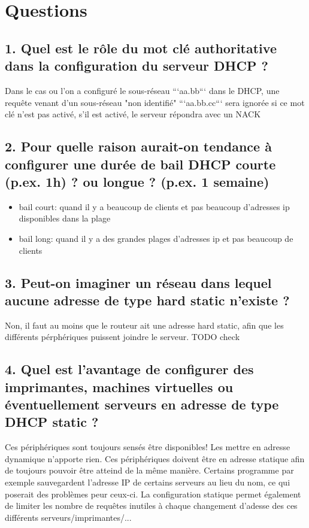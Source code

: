 \documentclass{article}
\begin{document}
\section{Questions}

\subsection*{1. Quel est le rôle du mot clé authoritative dans la configuration du serveur DHCP ?}
Dans le cas ou l'on a configuré le sous-réseau ```aa.bb``` dans le DHCP, une requête venant d'un sous-réseau "non identifié" ```aa.bb.cc``` sera ignorée si ce mot clé n'est pas activé, s'il est activé, le serveur répondra avec un NACK

\subsection*{2. Pour quelle raison aurait-on tendance à configurer une durée de bail DHCP courte (p.ex. 1h) ? ou longue ? (p.ex. 1 semaine)}
\begin{itemize}
\item bail court: quand il y a beaucoup de clients et pas beaucoup d'adresses ip disponibles dans la plage
\item bail long: quand il y a des grandes plages d'adresses ip et pas beaucoup de clients
\end{itemize}

\subsection*{3. Peut-on imaginer un réseau dans lequel aucune adresse de type hard static n’existe ?}
Non, il faut au moins que le routeur ait une adresse hard static, afin que les différents pérphériques puissent joindre le serveur.
TODO check

\subsection*{4. Quel est l’avantage de configurer des imprimantes, machines virtuelles ou éventuellement serveurs en adresse de type DHCP static ?}
Ces périphériques sont toujours sensés être disponibles! Les mettre en adresse dynamique n'apporte rien. Ces périphériques doivent être en adresse statique afin de toujours pouvoir être atteind de la même manière. Certains programme par exemple sauvegardent l'adresse IP de certains serveurs au lieu du nom, ce qui poserait des problèmes peur ceux-ci. La configuration statique permet également de limiter les nombre de requêtes inutiles à chaque changement d'adesse des ces différents serveurs/imprimantes/...
\end{document}
